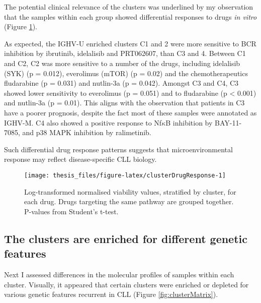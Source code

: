 \documentclass[11pt, a4paper, twosided]{book}
\begin{document}
The potential clinical relevance of the clusters was underlined by my observation that the samples within each group showed differential responses to drugs \emph{in vitro} (Figure \ref{fig:clusterDrugResponse}).

As expected, the IGHV-U enriched clusters C1 and 2 were more sensitive to BCR inhibition by ibrutinib, idelalisib and PRT062607, than C3 and 4. Between C1 and C2, C2 was more sensitive to a number of the drugs, including idelalisib (SYK) (p = 0.012), everolimus (mTOR) (p = 0.02) and the chemotherapeutics fludarabine (p = 0.031) and nutlin-3a (p = 0.042). Amongst C3 and C4, C3 showed lower sensitivity to everolimus (p = 0.051) and to fludarabine (p \textless{} 0.001) and nutlin-3a (p = 0.01). This aligns with the observation that patients in C3 have a poorer prognosis, despite the fact most of these samples were annotated as IGHV-M. C4 also showed a positive response to Nf\(\kappa\)B inhibition by BAY-11-7085, and p38 MAPK inhibition by ralimetinib.

Such differential drug response patterns suggests that microenvironmental response may reflect disease-specific CLL biology.


\begin{figure}

{\centering \texttt{[image: thesis\_files/figure-latex/clusterDrugResponse-1]} 

}

\caption{Log-transformed normalised viability values, stratified by cluster, for each drug. Drugs targeting the same pathway are grouped together. P-values from Student's t-test.}\label{fig:clusterDrugResponse}
\end{figure}
\hypertarget{cluster-genetics}{%
\subsection{The clusters are enriched for different genetic features}\label{cluster-genetics}}

Next I assessed differences in the molecular profiles of samples within each cluster. Visually, it appeared that certain clusters were enriched or depleted for various genetic features recurrent in CLL (Figure \ref{fig:clusterMatrix}).
\end{document}
